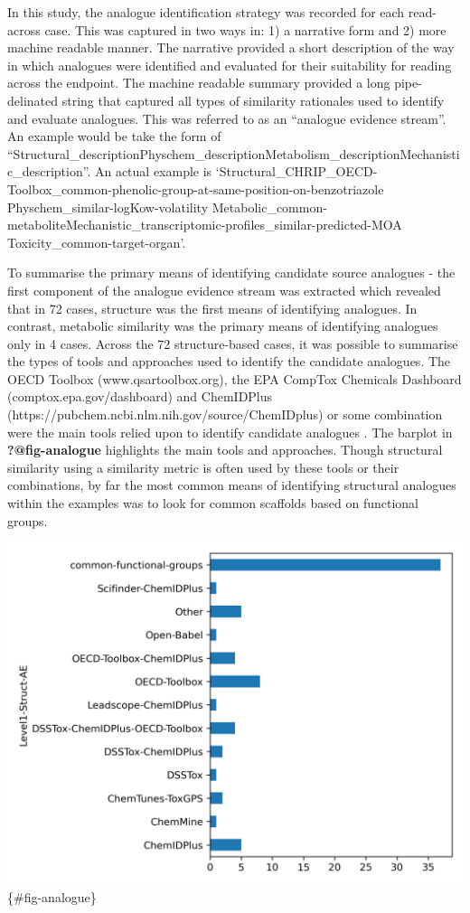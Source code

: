 \documentclass[
  super,
  preprint,
  3p]{elsarticle}
\begin{document}
In this study, the analogue identification strategy was recorded for
each read-across case. This was captured in two ways in: 1) a narrative
form and 2) more machine readable manner. The narrative provided a short
description of the way in which analogues were identified and evaluated
for their suitability for reading across the endpoint. The machine
readable summary provided a long pipe-delinated string that captured all
types of similarity rationales used to identify and evaluate analogues.
This was referred to as an ``analogue evidence stream''. An example
would be take the form of
``Structural\_description\textbar Physchem\_description\textbar Metabolism\_description\textbar Mechanistic\_description''.
An actual example is
`Structural\_CHRIP\_OECD-Toolbox\_common-phenolic-group-at-same-position-on-benzotriazole
\textbar{} Physchem\_similar-logKow-volatility \textbar{}
Metabolic\_common-metabolite\textbar Mechanistic\_transcriptomic-profiles\_similar-predicted-MOA
\textbar Toxicity\_common-target-organ'.

To summarise the primary means of identifying candidate source analogues
- the first component of the analogue evidence stream was extracted
which revealed that in 72 cases, structure was the first means of
identifying analogues. In contrast, metabolic similarity was the primary
means of identifying analogues only in 4 cases. Across the 72
structure-based cases, it was possible to summarise the types of tools
and approaches used to identify the candidate analogues. The OECD
Toolbox (www.qsartoolbox.org), the EPA CompTox Chemicals Dashboard
(comptox.epa.gov/dashboard) and ChemIDPlus
(https://pubchem.ncbi.nlm.nih.gov/source/ChemIDplus) or some combination
were the main tools relied upon to identify candidate analogues . The
barplot in \textbf{?@fig-analogue} highlights the main tools and
approaches. Though structural similarity using a similarity metric is
often used by these tools or their combinations, by far the most common
means of identifying structural analogues within the examples was to
look for common scaffolds based on functional groups.

\includegraphics{analogue_stream.png} \{\#fig-analogue\}
\end{document}
